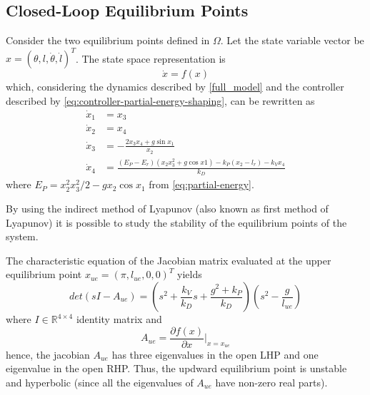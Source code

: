\documentclass[main.tex]{subfiles}
\begin{document}
\subsection{Closed-Loop Equilibrium Points}
Consider the two equilibrium points defined in $\Omega$.
Let the state variable vector be $x = (\theta, l, \dot{\theta},
\dot{l})^T$. The state space representation is
\begin{equation}
  \dot{x} = f(x)
\end{equation}
which, considering the dynamics described by \eqref{full_model}
and the controller described by
\eqref{eq:controller-partial-energy-shaping},
can be rewritten as 
\begin{align}
  \dot{x}_1 &= x_3 \\
  \dot{x}_2 &= x_4 \\
  \dot{x}_3 &= -\frac{2 x_3 x_4 + g\sin x_1}{x_2} \\
  \dot{x}_4 &= \frac{(E_P-E_r)(x_2 x_3^2 + g\cos x1)
    -k_P(x_2-l_r)-k_V x_4}{k_D}
\end{align}
where $E_P=x_2^2 x_3^2 / 2 - g x_2 \cos x_1$ from
\eqref{eq:partial-energy}.

By using the indirect method of Lyapunov (also known
as first 
method of Lyapunov) it is possible to study
the stability of the equilibrium points of the system.

The characteristic equation of the Jacobian matrix evaluated
at the upper equilibrium point $x_{ue} = (\pi, l_{ue}, 0, 0)^T$
yields
\begin{equation}
  det(sI-A_{ue}) = \left( s^2 + \frac{k_V}{k_D}s +
    \frac{g^2+k_P}{k_D} \right) \left( s^2 - \frac{g}{l_{ue}}
    \right)
\end{equation}
where $I \in \mathbb{R}^{4 \times 4}$ identity matrix and
\begin{equation}
  A_{ue} = \frac{\partial f(x)}{\partial x} \bigg\rvert_{x=x_{ue}}
\end{equation}
hence, the jacobian $A_{ue}$ has three eigenvalues in the open LHP and
one eigenvalue in the open RHP. Thus, the updward equilibrium point
is unstable and hyperbolic (since all the eigenvalues of $A_{ue}$
have non-zero real parts).
\end{document}
